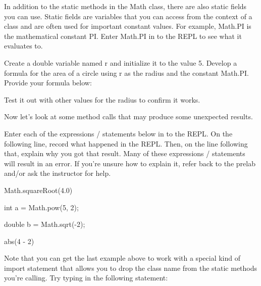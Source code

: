In addition to the static methods in the Math class, there are also static fields you can use. Static fields are variables that you can access from the context of a class and are often used for important constant values. For example, Math.PI is the mathematical constant PI. Enter Math.PI in to the REPL to see what it evaluates to. 

\begin{exer}
Create a double variable named r and initialize it to the value 5. Develop a formula for the area of a circle using r as the radius and the constant Math.PI. Provide your formula below:

\evalline

Test it out with other values for the radius to confirm it works. 
\end{exer}

Now let's look at some method calls that may produce some unexpected results.

\begin{eval}

Enter each of the expressions / statements below in to the REPL. On the following line, record what happened in the REPL. Then, on the line following that, explain why you got that result. Many of these expressions / statements will result in 
an error. If you're unsure how to explain it, refer back to the prelab and/or ask the instructor for help.

\begin{sevalenum}

\item Math.squareRoot(4.0)

\evallinetwo

\item int a = Math.pow(5, 2);

\evallinetwo

\item double b = Math.sqrt(-2);

\evallinetwo

\item abs(4 - 2)

\evallinetwo

\end{sevalenum}
\end{eval}

Note that you can get the last example above to work with a special kind of import statement that allows you to drop the class name from the static methods you're calling. Try typing in the following statement:

